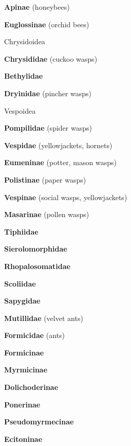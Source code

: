 \documentclass[letterpaper,10pt]{article}
\begin{document}
{\makebox[0.8cm]{}  \textbf{Apinae} (honeybees) \par
\makebox[0.8cm]{}  \textbf{Euglossinae} (orchid bees) \par
\makebox[0.4cm]{}  Chrysidoidea \par
\makebox[0.6cm]{}  \textbf{Chrysididae} (cuckoo wasps) \par
\makebox[0.6cm]{}  \textbf{Bethylidae} \par
\makebox[0.6cm]{}  \textbf{Dryinidae} (pincher wasps) \par
\makebox[0.4cm]{}  Vespoidea \par
\makebox[0.6cm]{}  \textbf{Pompilidae} (spider wasps) \par
\makebox[0.6cm]{}  \textbf{Vespidae} (yellowjackets, hornets) \par
\makebox[0.8cm]{}  \textbf{Eumeninae} (potter, mason wasps) \par
\makebox[0.8cm]{}  \textbf{Polistinae} (paper wasps) \par
\makebox[0.8cm]{}  \textbf{Vespinae} (social wasps, yellowjackets) \par
\makebox[0.8cm]{}  \textbf{Masarinae} (pollen wasps) \par
\makebox[0.6cm]{}  \textbf{Tiphiidae} \par
\makebox[0.6cm]{}  \textbf{Sierolomorphidae} \par
\makebox[0.6cm]{}  \textbf{Rhopalosomatidae} \par
\makebox[0.6cm]{}  \textbf{Scoliidae} \par
\makebox[0.6cm]{}  \textbf{Sapygidae} \par
\makebox[0.6cm]{}  \textbf{Mutillidae} (velvet ants) \par
\makebox[0.6cm]{}  \textbf{Formicidae} (ants) \par
\makebox[0.8cm]{}  \textbf{Formicinae} \par
\makebox[0.8cm]{}  \textbf{Myrmicinae} \par
\makebox[0.8cm]{}  \textbf{Dolichoderinae} \par
\makebox[0.8cm]{}  \textbf{Ponerinae} \par
\makebox[0.8cm]{}  \textbf{Pseudomyrmecinae} \par
\makebox[0.8cm]{}  \textbf{Ecitoninae} \par
}
\end{document}
